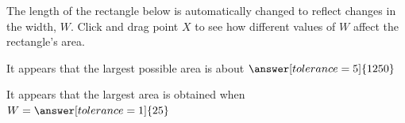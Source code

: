 \documentclass{ximera}
\begin{document}
\begin{exploration}
The length of the rectangle below is automatically changed to reflect changes in the width, $W$. Click and drag point $X$ to see how different values of $W$ affect the rectangle's area.

\end{exploration}

\begin{problem}
It appears that the largest possible area is about $\answer[tolerance=5]{1250}$
\end{problem}

\begin{problem}
It appears that the largest area is obtained when $W = \answer[tolerance=1]{25}$
\end{problem}
\end{document}
